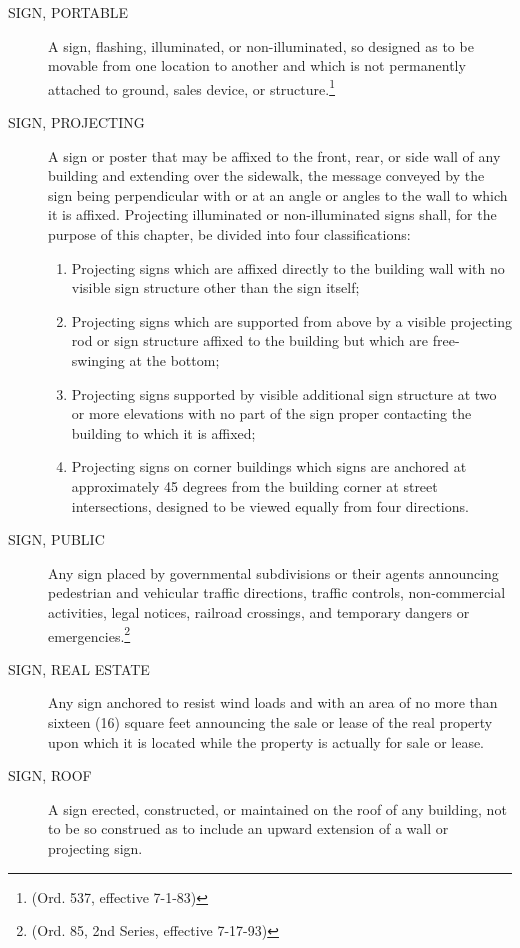 \begin{description}
    \item[SIGN, PORTABLE] A sign, flashing, illuminated, or non-illuminated, so designed as to be movable from one location to another and which is not permanently attached to ground, sales device, or structure.\footnote{(Ord. 537, effective 7-1-83)}
    \item[SIGN, PROJECTING] A sign or poster that may be affixed to the front, rear, or side wall of any building and extending over the sidewalk, the message conveyed by the sign being perpendicular with or at an angle or angles to the wall to which it is affixed.  Projecting illuminated or non-illuminated signs shall, for the purpose of this chapter, be divided into four classifications:
        \begin{enumerate}
            \item Projecting signs which are affixed directly to the building wall with no visible sign structure other than the sign itself;
            \item Projecting signs which are supported from above by a visible projecting rod or sign structure affixed to the building but which are free-swinging at the bottom;
            \item Projecting signs supported by visible additional sign structure at two or more elevations with no part of the sign proper contacting the building to which it is affixed;
            \item Projecting signs on corner buildings which signs are anchored at approximately 45 degrees from the building corner at street intersections, designed to be viewed equally from four directions.
        \end{enumerate}
    \item[SIGN, PUBLIC] Any sign placed by governmental subdivisions or their agents announcing pedestrian and vehicular traffic directions, traffic controls, non-commercial activities, legal notices, railroad crossings, and temporary dangers or emergencies.\footnote{(Ord. 85, 2nd Series, effective 7-17-93)}
    \item[SIGN, REAL ESTATE] Any sign anchored to resist wind loads and with an area of no more than sixteen (16) square feet announcing the sale or lease of the real property upon which it is located while the property is actually for sale or lease.
    \item[SIGN, ROOF] A sign erected, constructed, or maintained on the roof of any building, not to be so construed as to include an upward extension of a wall or projecting sign.

\end{description}
